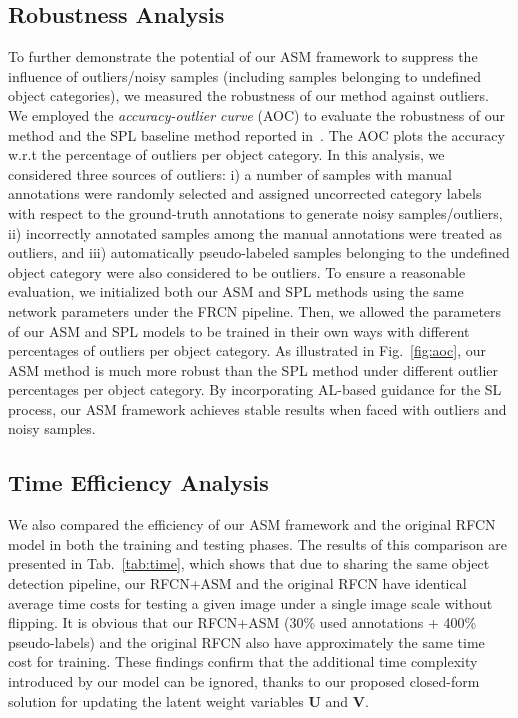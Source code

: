 \documentclass[journal]{IEEEtran}
\begin{document}
{\subsection{Robustness Analysis}
To further demonstrate the potential of our {ASM} framework to suppress the influence of outliers/noisy samples (including samples belonging to undefined object categories), we measured the robustness of our method against outliers. We employed the {\em accuracy-outlier curve} (AOC) to evaluate the robustness of our method and the SPL baseline method reported in~\cite{spcl}. The AOC plots the accuracy w.r.t the percentage of outliers per object category. In this analysis, we considered three sources of outliers: i) a number of samples with manual annotations {were randomly selected and assigned uncorrected} category labels with respect to the ground-truth annotations to generate noisy samples/outliers, ii) incorrectly annotated samples among the manual annotations were treated as outliers, and iii) automatically pseudo-labeled samples belonging to the undefined object category were also considered to be outliers. To ensure a reasonable evaluation, we initialized both our {ASM} and SPL methods using the same network parameters under the FRCN pipeline. Then, we allowed the parameters of our {ASM} and SPL models to be trained in their own ways with different percentages of outliers per object category. As illustrated in Fig.~\ref{fig:aoc}, our {ASM} method is much more robust than the SPL method under different outlier percentages per object category. By incorporating AL-based guidance for the SL process, our {ASM} framework achieves stable results when faced with outliers and noisy samples. 




\subsection{Time Efficiency Analysis}
We also compared the efficiency of our ASM framework and the original RFCN model in both the training and testing phases. The results of this comparison are presented in Tab.~\ref{tab:time}, which shows that due to sharing the same object detection pipeline, our RFCN+{ASM} and the original RFCN have identical average time costs for testing a given image under a single image scale without flipping. It is obvious that our RFCN+{ASM} (30\% used annotations + 400\% pseudo-labels) and the original RFCN also have approximately the same time cost for training. These findings confirm that the additional time complexity introduced by our model can be ignored, thanks to our proposed closed-form solution for updating the latent weight variables $\mathbf{U}$ and $\mathbf{V}$. 

}
\end{document}
